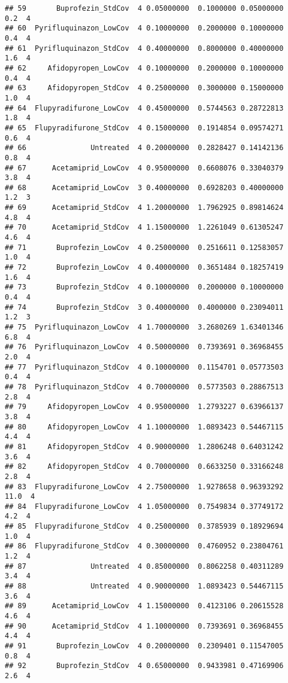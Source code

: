 \documentclass[
]{article}
\begin{document}
\begin{verbatim}
## 59       Buprofezin_StdCov  4 0.05000000  0.1000000 0.05000000      0.2  4
## 60  Pyrifluquinazon_LowCov  4 0.10000000  0.2000000 0.10000000      0.4  4
## 61  Pyrifluquinazon_StdCov  4 0.40000000  0.8000000 0.40000000      1.6  4
## 62     Afidopyropen_LowCov  4 0.10000000  0.2000000 0.10000000      0.4  4
## 63     Afidopyropen_StdCov  4 0.25000000  0.3000000 0.15000000      1.0  4
## 64  Flupyradifurone_LowCov  4 0.45000000  0.5744563 0.28722813      1.8  4
## 65  Flupyradifurone_StdCov  4 0.15000000  0.1914854 0.09574271      0.6  4
## 66               Untreated  4 0.20000000  0.2828427 0.14142136      0.8  4
## 67      Acetamiprid_LowCov  4 0.95000000  0.6608076 0.33040379      3.8  4
## 68      Acetamiprid_LowCov  3 0.40000000  0.6928203 0.40000000      1.2  3
## 69      Acetamiprid_StdCov  4 1.20000000  1.7962925 0.89814624      4.8  4
## 70      Acetamiprid_StdCov  4 1.15000000  1.2261049 0.61305247      4.6  4
## 71       Buprofezin_LowCov  4 0.25000000  0.2516611 0.12583057      1.0  4
## 72       Buprofezin_LowCov  4 0.40000000  0.3651484 0.18257419      1.6  4
## 73       Buprofezin_StdCov  4 0.10000000  0.2000000 0.10000000      0.4  4
## 74       Buprofezin_StdCov  3 0.40000000  0.4000000 0.23094011      1.2  3
## 75  Pyrifluquinazon_LowCov  4 1.70000000  3.2680269 1.63401346      6.8  4
## 76  Pyrifluquinazon_LowCov  4 0.50000000  0.7393691 0.36968455      2.0  4
## 77  Pyrifluquinazon_StdCov  4 0.10000000  0.1154701 0.05773503      0.4  4
## 78  Pyrifluquinazon_StdCov  4 0.70000000  0.5773503 0.28867513      2.8  4
## 79     Afidopyropen_LowCov  4 0.95000000  1.2793227 0.63966137      3.8  4
## 80     Afidopyropen_LowCov  4 1.10000000  1.0893423 0.54467115      4.4  4
## 81     Afidopyropen_StdCov  4 0.90000000  1.2806248 0.64031242      3.6  4
## 82     Afidopyropen_StdCov  4 0.70000000  0.6633250 0.33166248      2.8  4
## 83  Flupyradifurone_LowCov  4 2.75000000  1.9278658 0.96393292     11.0  4
## 84  Flupyradifurone_LowCov  4 1.05000000  0.7549834 0.37749172      4.2  4
## 85  Flupyradifurone_StdCov  4 0.25000000  0.3785939 0.18929694      1.0  4
## 86  Flupyradifurone_StdCov  4 0.30000000  0.4760952 0.23804761      1.2  4
## 87               Untreated  4 0.85000000  0.8062258 0.40311289      3.4  4
## 88               Untreated  4 0.90000000  1.0893423 0.54467115      3.6  4
## 89      Acetamiprid_LowCov  4 1.15000000  0.4123106 0.20615528      4.6  4
## 90      Acetamiprid_StdCov  4 1.10000000  0.7393691 0.36968455      4.4  4
## 91       Buprofezin_LowCov  4 0.20000000  0.2309401 0.11547005      0.8  4
## 92       Buprofezin_StdCov  4 0.65000000  0.9433981 0.47169906      2.6  4

\end{verbatim}
\end{document}
